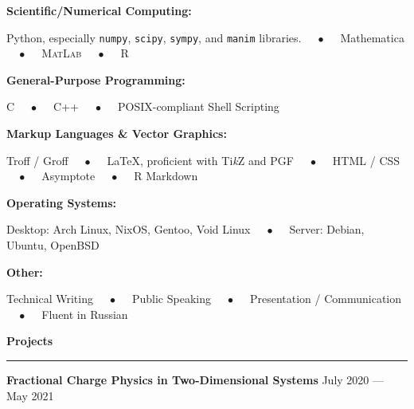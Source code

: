 \documentclass{article}
\begin{document}
\hspace{1.5em} \textbf{Scientific/Numerical Computing:}

\hspace{3.0em} Python, especially \texttt{numpy}, \texttt{scipy}, \texttt{sympy}, and \texttt{manim} libraries. $\quad\bullet\quad$ Mathematica $\quad\bullet\quad$ \textsc{MatLab} $\quad\bullet\quad$ R

\vspace{0.5em}

\hspace{1.5em} \textbf{General-Purpose Programming:}

\hspace{3.0em} C $\quad\bullet\quad$ C++ $\quad\bullet\quad$ POSIX-compliant Shell Scripting

\vspace{0.5em}

\hspace{1.5em} \textbf{Markup Languages \& Vector Graphics:}

\hspace{3.0em} Troff / Groff $\quad\bullet\quad$ {\LaTeX}, proficient with Ti\textit{k}Z and PGF $\quad\bullet\quad$ HTML / CSS $\quad\bullet\quad$ Asymptote $\quad\bullet\quad$ R Markdown

\vspace{0.5em}

\hspace{1.5em} \textbf{Operating Systems:}

\hspace{3.0em} Desktop: Arch Linux, NixOS, Gentoo, Void Linux $\quad\bullet\quad$ Server: Debian, Ubuntu, OpenBSD

\vspace{0.5em}

\hspace{1.5em} \textbf{Other:}

\hspace{3.0em} Technical Writing $\quad\bullet\quad$ Public Speaking $\quad\bullet\quad$ Presentation / Communication $\quad\bullet\quad$ Fluent in Russian

\vspace{1em}

\textbf{\Large{Projects}} \\[-0.5em]
\rule{\textwidth}{1pt}

\hspace{1.5em} \textbf{Fractional Charge Physics in Two-Dimensional Systems} \hfill July 2020 --- May 2021
\end{document}
